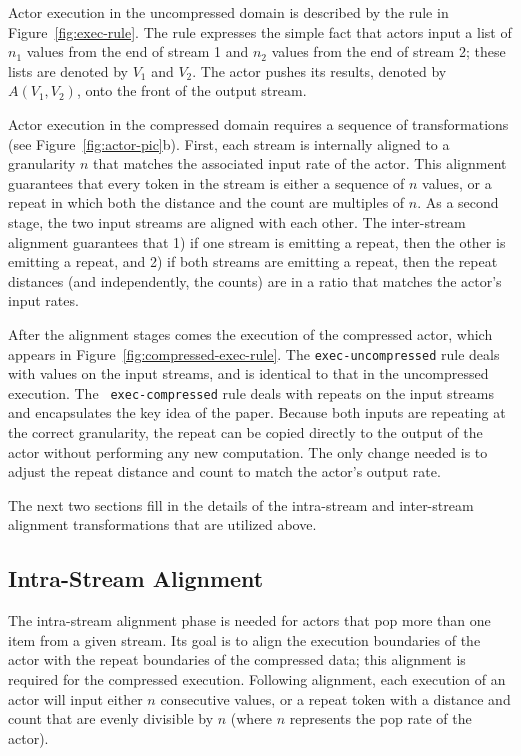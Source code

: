 Actor execution in the uncompressed domain is described by the rule in
Figure~\ref{fig:exec-rule}.  The rule expresses the simple fact that
actors input a list of $n_1$ values from the end of stream 1 and $n_2$
values from the end of stream 2; these lists are denoted by $V_1$ and
$V_2$.  The actor pushes its results, denoted by $A(V_1, V_2)$, onto
the front of the output stream.

Actor execution in the compressed domain requires a sequence of
transformations (see Figure~\ref{fig:actor-pic}b).  First, each stream
is internally aligned to a granularity $n$ that matches the associated
input rate of the actor.  This alignment guarantees that every token
in the stream is either a sequence of $n$ values, or a repeat in which
both the distance and the count are multiples of $n$.  As a second
stage, the two input streams are aligned with each other.  The
inter-stream alignment guarantees that 1) if one stream is emitting a
repeat, then the other is emitting a repeat, and 2) if both streams
are emitting a repeat, then the repeat distances (and independently,
the counts) are in a ratio that matches the actor's input rates.

After the alignment stages comes the execution of the compressed
actor, which appears in Figure~\ref{fig:compressed-exec-rule}.  The
{\tt exec-uncompressed} rule deals with values on the input streams,
and is identical to that in the uncompressed execution.  The {\tt
exec-compressed} rule deals with repeats on the input streams and
encapsulates the key idea of the paper.  Because both inputs are
repeating at the correct granularity, the repeat can be copied
directly to the output of the actor without performing any new
computation.  The only change needed is to adjust the repeat distance
and count to match the actor's output rate.

The next two sections fill in the details of the intra-stream and
inter-stream alignment transformations that are utilized above.

\subsection{Intra-Stream Alignment}

The intra-stream alignment phase is needed for actors that pop more
than one item from a given stream.  Its goal is to align the execution
boundaries of the actor with the repeat boundaries of the compressed
data; this alignment is required for the compressed execution.
Following alignment, each execution of an actor will input either $n$
consecutive values, or a repeat token with a distance and count that
are evenly divisible by $n$ (where $n$ represents the pop rate of the
actor).

